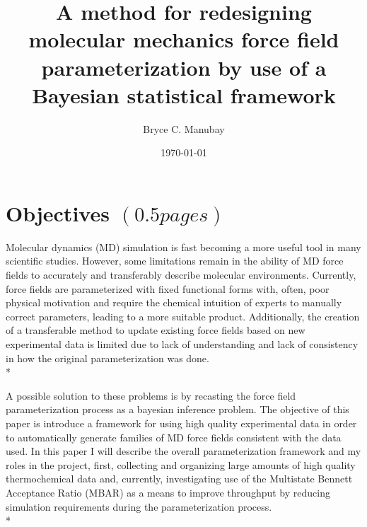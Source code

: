 \documentclass[rmp,nofootinbib,superscriptaddress,12pt,tightenlines,notitlepage]{revtex4-1}
\begin{document}


\title{A method for redesigning molecular mechanics force field parameterization by use of a Bayesian statistical framework}
\author{Bryce C. Manubay} 
\date{\today}

\maketitle
\section{Objectives $\left(0.5 pages\right)$}
Molecular dynamics (MD) simulation is fast becoming a more useful tool in many scientific studies. However, some limitations remain in the ability of MD force fields to accurately and transferably describe molecular environments. Currently, force fields are parameterized with fixed functional forms with, often, poor physical motivation and require the chemical intuition of experts to manually correct parameters, leading to a more suitable product. Additionally, the creation of a transferable method to update existing force fields based on new experimental data is limited due to lack of understanding and lack of consistency in how the original parameterization was done.\\*

A possible solution to these problems is by recasting the force field parameterization process as a bayesian inference problem. The objective of this paper is introduce a framework for using high quality experimental data in order to automatically generate families of MD force fields consistent with the data used. In this paper I will describe the overall parameterization framework and my roles in the project, first, collecting and organizing large amounts of high quality thermochemical data and, currently, investigating use of the Multistate Bennett Acceptance Ratio (MBAR) as a means to improve throughput by reducing simulation requirements during the parameterization process.\\*
\end{document}
